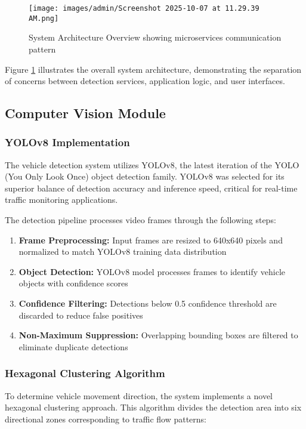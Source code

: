\documentclass[conference]{IEEEtran}
\begin{document}
\begin{figure}[H]
\centering
\texttt{[image: images/admin/Screenshot 2025-10-07 at 11.29.39 AM.png]}
\caption{System Architecture Overview showing microservices communication pattern}
\label{fig:architecture}
\end{figure}

Figure \ref{fig:architecture} illustrates the overall system architecture, demonstrating the separation of concerns between detection services, application logic, and user interfaces.

\subsection{Computer Vision Module}

\subsubsection{YOLOv8 Implementation}

The vehicle detection system utilizes YOLOv8, the latest iteration of the YOLO (You Only Look Once) object detection family. YOLOv8 was selected for its superior balance of detection accuracy and inference speed, critical for real-time traffic monitoring applications.

The detection pipeline processes video frames through the following steps:

\begin{enumerate}
\item \textbf{Frame Preprocessing:} Input frames are resized to 640x640 pixels and normalized to match YOLOv8 training data distribution
\item \textbf{Object Detection:} YOLOv8 model processes frames to identify vehicle objects with confidence scores
\item \textbf{Confidence Filtering:} Detections below 0.5 confidence threshold are discarded to reduce false positives
\item \textbf{Non-Maximum Suppression:} Overlapping bounding boxes are filtered to eliminate duplicate detections
\end{enumerate}

\subsubsection{Hexagonal Clustering Algorithm}

To determine vehicle movement direction, the system implements a novel hexagonal clustering approach. This algorithm divides the detection area into six directional zones corresponding to traffic flow patterns:
\end{document}
